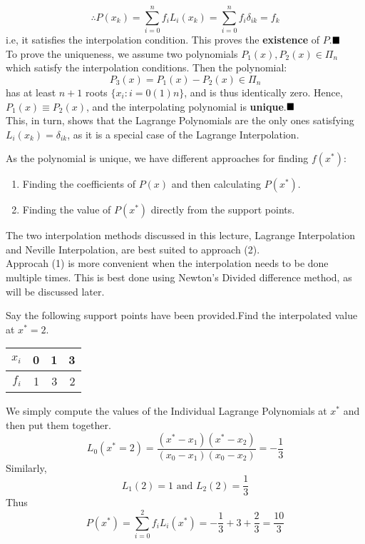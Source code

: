 $$\therefore P(x_k) = \sum_{i=0}^{n} f_i L_i(x_k) =
        \sum_{i=0}^{n} f_i \delta_{ik} = f_k$$
i.e, it satisfies the interpolation condition.
This proves the \textbf{existence} of $P$.$\hfill \blacksquare$\\[.2 cm]
To prove the uniqueness, we assume two polynomials $P_1(x),P_2(x) \in \Pi_n$ which satisfy the interpolation conditions. Then the polynomial:
$$P_3(x) = P_1(x)-P_2(x) \in \Pi_n$$ has at least $n+1$ roots $\{x_i: i = 0(1)n\}$, and is thus identically zero. Hence, $P_1(x) \equiv P_2(x)$, and the interpolating polynomial is \textbf{unique}.$ \hfill\blacksquare $\\[0.2 cm]
This, in turn, shows that the Lagrange Polynomials are the only ones satisfying $L_i(x_k) = \delta_{ik}$, as it is a special case of the Lagrange Interpolation.
\begin{rmark}
    As the polynomial is unique, we have different approaches for finding $f(x^*)$:
    \begin{enumerate}
        \item Finding the coefficients of $P(x)$ and then calculating $P(x^*)$.
        \item Finding the value of $P(x^*)$ directly from the support points.
    \end{enumerate}
    The two interpolation methods discussed in this lecture, Lagrange Interpolation and Neville Interpolation, are best suited to approach (2).\\
    Approcah (1) is more convenient when the interpolation needs to be done multiple times. This is best done using Newton's Divided difference method, as will be discussed later.
\end{rmark}
\begin{example}
    Say the following support points have been provided.Find the interpolated value at $x^* = 2$.\\[0.2 cm]
    \begin{center}
        \begin{tabular}{|r||r|r|r|}
            \hline
            $x_i$ & 0 & 1 & 3 \\
            \hline
            $f_i$ & 1 & 3 & 2 \\
            \hline
        \end{tabular}
    \end{center}
\end{example}
\begin{soln}
    We simply compute the values of the Individual Lagrange Polynomials at $x^*$ and then put them together.
    $$L_0(x^* = 2) = \frac{(x^* - x_1)(x^* - x_2)}{(x_0 - x_1)(x_0 - x_2)} = -\frac{1}{3}$$
    Similarly,
    $$L_1(2) = 1 \text{  and  } L_2(2) = \frac{1}{3}$$
    Thus $$P(x^*) = \sum_{i = 0}^2 f_i L_i(x^*) = -\frac{1}{3}+ 3 + \frac{2}{3} = \frac{10}{3}$$
\end{soln}

